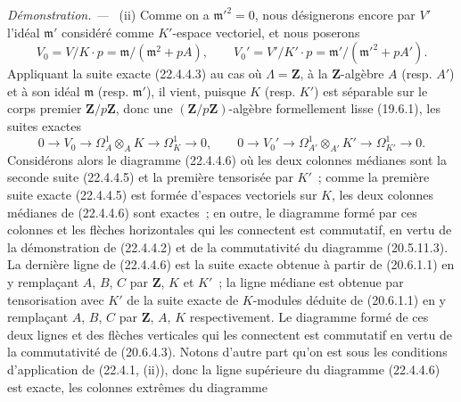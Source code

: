 \documentclass[10pt,oneside]{book}
\newcommand{\oldpage}[2][]{%
  \setcounter{footnote}{0}%
  \marginpar{\scriptsize\textbf{#1}~|~#2}\ignorespaces}
\newenvironment{proof}{%
  \par\medskip\noindent\textit{Démonstration. ---\ }}{\par}
\begin{document}
\begin{proof}
(ii) Comme on a $\mathfrak m'^2=0$, nous désignerons encore par $V'$ l'idéal
$\mathfrak m'$ considéré comme $K'$-espace vectoriel, et nous poserons
\begin{equation}
\label{0.22.4.4.4-fr}
  V_0=V/K\cdot p=\mathfrak m/(\mathfrak m^2+pA),\qquad
  V_0'=V'/K'\cdot p=\mathfrak m'/(\mathfrak m'^2+pA').
  \tag{22.4.4.4}
\end{equation}
Appliquant la suite exacte (22.4.4.3) au cas où $\Lambda=\mathbf Z$, à la
$\mathbf Z$-algèbre $A$ (resp. $A'$) et à son idéal $\mathfrak m$
(resp. $\mathfrak m'$), il vient, puisque $K$ (resp. $K'$) est séparable sur
le corps premier $\mathbf Z/p\mathbf Z$, donc une
$(\mathbf Z/p\mathbf Z)$-algèbre formellement lisse (19.6.1), les suites
exactes
\begin{equation}
\label{0.22.4.4.5-fr}
  0\longrightarrow V_0\longrightarrow\Omega^1_A\otimes_AK
  \longrightarrow\Omega^1_K\longrightarrow0,\qquad
  0\longrightarrow V_0'\longrightarrow\Omega^1_{A'}\otimes_{A'}K'
  \longrightarrow\Omega^1_{K'}\longrightarrow0.
  \tag{22.4.4.5}
\end{equation}
Considérons alors le diagramme (22.4.4.6) où les deux colonnes médianes sont
la seconde suite (22.4.4.5) et la première tensorisée par $K'$~; comme la
première suite exacte (22.4.4.5) est formée d'espaces vectoriels sur $K$,
les deux colonnes médianes de (22.4.4.6) sont exactes~; en outre, le
diagramme formé par ces colonnes et les flèches horizontales qui les
connectent est commutatif, en vertu de la démonstration de (22.4.4.2) et de
la commutativité du diagramme (20.5.11.3). La dernière ligne de (22.4.4.6)
est la suite exacte obtenue à partir de (20.6.1.1) en y remplaçant $A$, $B$,
$C$ par $\mathbf Z$, $K$ et $K'$~; la ligne médiane est obtenue par
tensorisation avec $K'$ de la suite exacte de $K$-modules déduite de
(20.6.1.1) en y remplaçant $A$, $B$, $C$ par $\mathbf Z$, $A$, $K$
respectivement. Le diagramme formé de ces deux lignes et des flèches
verticales qui les connectent est commutatif en vertu de la commutativité de
(20.6.4.3). Notons d'autre part qu'on est sous les conditions d'application
de (22.4.1, (ii)), donc la ligne supérieure du diagramme (22.4.4.6) est
exacte, les colonnes extrêmes du diagramme

\oldpage[0\textsubscript{IV-1}]{196}


\end{proof}
\end{document}
